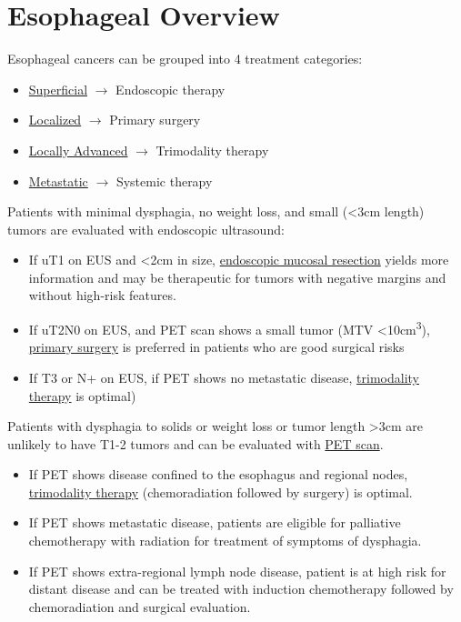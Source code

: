 \documentclass[
]{book}
\providecommand{\tightlist}{%
  \setlength{\itemsep}{0pt}\setlength{\parskip}{0pt}}
\begin{document}
\hypertarget{EsoIntro}{%
\chapter{Esophageal Overview}\label{EsoIntro}}

Esophageal cancers can be grouped into 4 treatment categories:

\begin{itemize}
\tightlist
\item
  \protect\hyperlink{superficial}{Superficial} \(\rightarrow\) Endoscopic therapy
\item
  \protect\hyperlink{localized}{Localized} \(\rightarrow\) Primary surgery
\item
  \protect\hyperlink{locally_advanced}{Locally Advanced} \(\rightarrow\) Trimodality therapy
\item
  \protect\hyperlink{metastatic}{Metastatic} \(\rightarrow\) Systemic therapy
\end{itemize}

Patients with minimal dysphagia, no weight loss, and small (\textless3cm length) tumors are evaluated with endoscopic ultrasound:

\begin{itemize}
\tightlist
\item
  If uT1 on EUS and \textless2cm in size, \protect\hyperlink{emr}{endoscopic mucosal resection} yields more information and may be therapeutic for tumors with negative margins and without high-risk features.
\item
  If uT2N0 on EUS, and PET scan shows a small tumor (MTV \textless10cm\textsuperscript{3}), \protect\hyperlink{primary_surgery}{primary surgery} is preferred in patients who are good surgical risks
\item
  If T3 or N+ on EUS, if PET shows no metastatic disease, \protect\hyperlink{trimodality}{trimodality therapy} is optimal)
\end{itemize}

Patients with dysphagia to solids or weight loss or tumor length \textgreater3cm are unlikely to have T1-2 tumors and can be evaluated with \protect\hyperlink{pet}{PET scan}.

\begin{itemize}
\tightlist
\item
  If PET shows disease confined to the esophagus and regional nodes, \protect\hyperlink{trimodality}{trimodality therapy} (chemoradiation followed by surgery) is optimal.
\item
  If PET shows metastatic disease, patients are eligible for palliative chemotherapy with radiation for treatment of symptoms of dysphagia.
\item
  If PET shows extra-regional lymph node disease, patient is at high risk for distant disease and can be treated with induction chemotherapy followed by chemoradiation and surgical evaluation.
\end{itemize}
\end{document}
